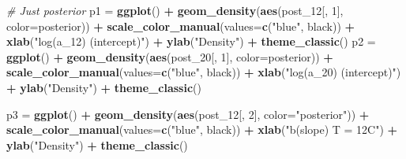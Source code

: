 \documentclass[
]{article}
\newenvironment{Shaded}{\begin{snugshade}}{\end{snugshade}}
\newcommand{\AttributeTok}[1]{\textcolor[rgb]{0.13,0.29,0.53}{#1}}
\newcommand{\CommentTok}[1]{\textcolor[rgb]{0.56,0.35,0.01}{\textit{#1}}}
\newcommand{\DecValTok}[1]{\textcolor[rgb]{0.00,0.00,0.81}{#1}}
\newcommand{\FunctionTok}[1]{\textcolor[rgb]{0.13,0.29,0.53}{\textbf{#1}}}
\newcommand{\NormalTok}[1]{#1}
\newcommand{\OtherTok}[1]{\textcolor[rgb]{0.56,0.35,0.01}{#1}}
\newcommand{\SpecialCharTok}[1]{\textcolor[rgb]{0.81,0.36,0.00}{\textbf{#1}}}
\newcommand{\StringTok}[1]{\textcolor[rgb]{0.31,0.60,0.02}{#1}}
\begin{document}
\begin{Shaded}
\begin{Highlighting}[]
\CommentTok{\# Just posterior}
\NormalTok{p1 }\OtherTok{=} \FunctionTok{ggplot}\NormalTok{() }\SpecialCharTok{+} 
                \FunctionTok{geom\_density}\NormalTok{(}\FunctionTok{aes}\NormalTok{(post\_12[, }\DecValTok{1}\NormalTok{], }\AttributeTok{color=}\StringTok{\textquotesingle{}posterior\textquotesingle{}}\NormalTok{)) }\SpecialCharTok{+} 
                \FunctionTok{scale\_color\_manual}\NormalTok{(}\AttributeTok{values=}\FunctionTok{c}\NormalTok{(}\StringTok{"blue"}\NormalTok{, }\StringTok{\textquotesingle{}black\textquotesingle{}}\NormalTok{)) }\SpecialCharTok{+}
                \FunctionTok{xlab}\NormalTok{(}\StringTok{"log(a\_12) (intercept)"}\NormalTok{) }\SpecialCharTok{+} 
                \FunctionTok{ylab}\NormalTok{(}\StringTok{"Density"}\NormalTok{) }\SpecialCharTok{+}
                \FunctionTok{theme\_classic}\NormalTok{()}
\NormalTok{p2 }\OtherTok{=} \FunctionTok{ggplot}\NormalTok{() }\SpecialCharTok{+} 
                \FunctionTok{geom\_density}\NormalTok{(}\FunctionTok{aes}\NormalTok{(post\_20[, }\DecValTok{1}\NormalTok{], }\AttributeTok{color=}\StringTok{\textquotesingle{}posterior\textquotesingle{}}\NormalTok{)) }\SpecialCharTok{+} 
                \FunctionTok{scale\_color\_manual}\NormalTok{(}\AttributeTok{values=}\FunctionTok{c}\NormalTok{(}\StringTok{"blue"}\NormalTok{, }\StringTok{\textquotesingle{}black\textquotesingle{}}\NormalTok{)) }\SpecialCharTok{+}
                \FunctionTok{xlab}\NormalTok{(}\StringTok{"log(a\_20) (intercept)"}\NormalTok{) }\SpecialCharTok{+} 
                \FunctionTok{ylab}\NormalTok{(}\StringTok{"Density"}\NormalTok{) }\SpecialCharTok{+}
                \FunctionTok{theme\_classic}\NormalTok{()}

\NormalTok{p3 }\OtherTok{=} \FunctionTok{ggplot}\NormalTok{() }\SpecialCharTok{+}
                \FunctionTok{geom\_density}\NormalTok{(}\FunctionTok{aes}\NormalTok{(post\_12[, }\DecValTok{2}\NormalTok{], }\AttributeTok{color=}\StringTok{"posterior"}\NormalTok{)) }\SpecialCharTok{+}
                \FunctionTok{scale\_color\_manual}\NormalTok{(}\AttributeTok{values=}\FunctionTok{c}\NormalTok{(}\StringTok{"blue"}\NormalTok{, }\StringTok{\textquotesingle{}black\textquotesingle{}}\NormalTok{)) }\SpecialCharTok{+}
                \FunctionTok{xlab}\NormalTok{(}\StringTok{"b(slope) T = 12C"}\NormalTok{) }\SpecialCharTok{+} 
                \FunctionTok{ylab}\NormalTok{(}\StringTok{"Density"}\NormalTok{) }\SpecialCharTok{+}
                \FunctionTok{theme\_classic}\NormalTok{()}


\end{Highlighting}
\end{Shaded}
\end{document}
